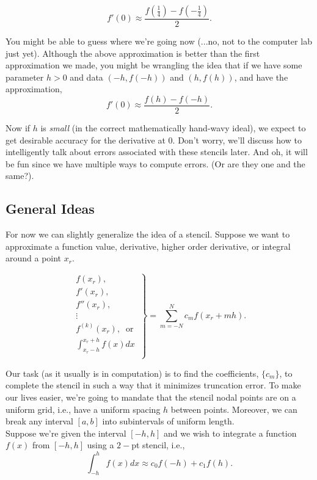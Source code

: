 \documentclass[paper=a4, fontsize=11pt]{scrartcl} %
\numberwithin{equation}{section} %
\numberwithin{figure}{section} %
\numberwithin{table}{section} %
\begin{document}
$$f'(0)\approx \frac{ f(\frac{1}{4}) - f(-\frac{1}{4}) }{2}.$$

You might be able to guess where we're going now (...no, not to the computer lab just yet). Although the above approximation is better than the first approximation we made, you might be wrangling the idea that if we have some parameter $h>0$ and data $(-h,f(-h))$ and $(h,f(h))$, and have the approximation, $$f'(0)\approx \frac{f(h)-f(-h)}{2}.$$

Now if $h$ is \emph{small} (in the correct mathematically hand-wavy ideal), we expect to get desirable accuracy for the derivative at $0$. Don't worry, we'll discuss how to intelligently talk about errors associated with these stencils later. And oh, it will be fun since we have multiple ways to compute errors. (Or are they one and the same?).\\

\subsection{General Ideas}

For now we can slightly generalize the idea of a stencil. Suppose we want to approximate a function value, derivative, higher order derivative, or integral around a point $x_r$.

$$\left. \begin{array}{c}
f(x_r), \\
f'(x_r), \\
f''(x_r), \\
\vdots \\
f^{(k)}(x_r),\ \mbox{ or } \\
\displaystyle\int_{x_r-h}^{x_r+h} f(x) dx \\
\end{array} \right\} =  \sum_{m=-N}^{N} c_{m} f(x_r+mh).$$ 

Our task (as it usually is in computation) is to find the coefficients, $\{c_{m}\}$, to complete the stencil in such a way that it minimizes truncation error. To make our lives easier, we're going to mandate that the stencil nodal points are on a uniform grid, i.e., have a uniform spacing $h$ between points. Moreover, we can break any interval $[a,b]$ into subintervals of uniform length. \\

Suppose we're given the interval $[-h,h]$ and we wish to integrate a function $f(x)$ from $[-h,h]$ using a $2-$pt stencil, i.e., $$\displaystyle\int_{-h}^{h} f(x) dx \approx c_0 f(-h) + c_1 f(h).$$ 
\end{document}

